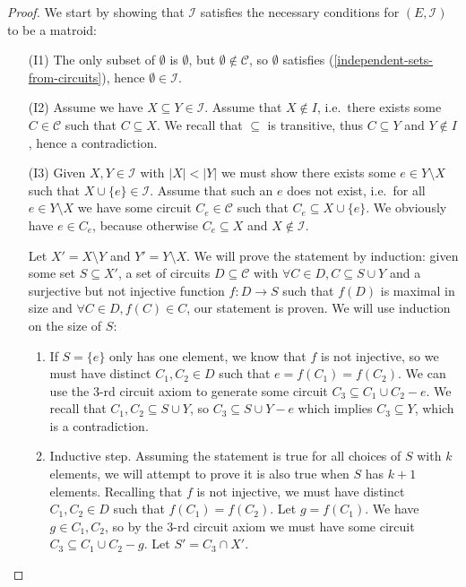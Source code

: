 \begin{proof} We start by showing that $\mathcal I $ satisfies the necessary conditions for $(E, \mathcal I )$ to be a matroid:
    \begin{enumerate} 
        \item[(I1)] The only subset of $\emptyset $ is $ \emptyset $, but $ \emptyset \not\in \mathcal C $, so $ \emptyset $ satisfies (\ref{independent-sets-from-circuits}), hence $\emptyset \in \mathcal I$.
        \item[(I2)] Assume we have $X \subseteq Y \in \mathcal I$. Assume that $X \not\in I$, i.e.\ there exists some $C \in \mathcal C $ such that $C \subseteq X$. We recall that $\subseteq $ is transitive, thus $C \subseteq Y$ and $Y \not\in I$, hence a contradiction.
        \item[(I3)] Given $X, Y \in \mathcal I $ with $|X| < |Y|$ we must show there exists some $e \in Y \setminus X$ such that $X \cup \{e\} \in \mathcal I$. Assume that such an $e$ does not exist, i.e.\ for all $e \in Y \setminus X$ we have some circuit $C _e \in \mathcal C $ such that $C _e \subseteq X \cup \{e\}$. We obviously have $e \in C_e$, because otherwise $C_e \subseteq X$ and $X \not\in \mathcal I$.


     Let $X' = X \setminus Y$ and $Y' = Y \setminus X$. We will prove the statement by induction: given some set $S \subseteq X'$, a set of circuits $D \subseteq \mathcal C$ with $\forall C \in D, C \subseteq  S \cup Y$ and a surjective but not injective function $f : D \to S$ such that $f(D)$ is maximal in size and $\forall C \in D, f(C) \in C$, our statement is proven. We will use induction on the size of $S$:
    \begin{enumerate}
      \item If $S = \{e\}$ only has one element, we know that $f$ is not injective, so we must have distinct $C _1, C _2 \in D$ such that $e = f(C _1 ) = f(C _2)$. We can use the $3$-rd circuit axiom to generate some circuit $C _3 \subseteq C _1 \cup C _2 - e$. We recall that $C _1 , C _2 \subseteq S \cup Y $, so $C _3 \subseteq S \cup Y - e$ which implies $C _3 \subseteq Y$, which is a contradiction.
        \item Inductive step. Assuming the statement is true for all choices of $S$ with $k$ elements, we will attempt to prove it is also true when $S$ has $k + 1$ elements. Recalling that $f$ is not injective, we must have distinct $C _1, C _2 \in D$ such that $f(C _1 ) = f(C _2)$. Let $g = f(C _1)$. We have $g \in C _1, C _2$, so by the $3$-rd circuit axiom we must have some circuit $C  _3 \subseteq C _1 \cup C _2 - g$. Let $S' = C _3 \cap X'$. 


\end{enumerate}
\end{enumerate}
\end{proof}
